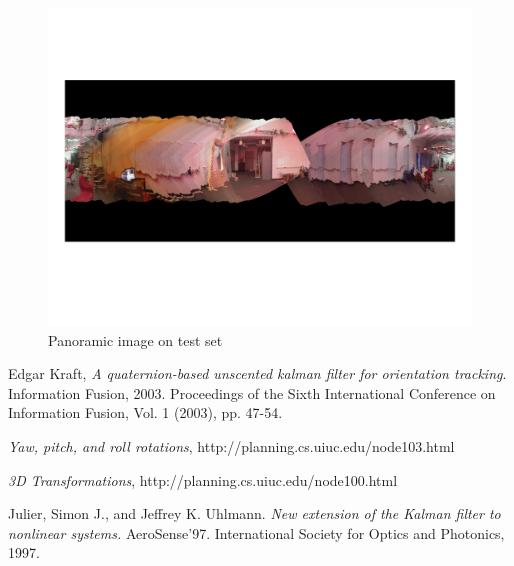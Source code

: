 \documentclass[english]{article}
\begin{document}
\begin{figure}
\centering
\includegraphics[scale=0.5]{images/pano_test.png} 
\caption{Panoramic image on test set}
\label{fig:pano_test}
\end{figure}


\begin{thebibliography}{2} %

Edgar Kraft, \emph{A quaternion-based unscented kalman filter for orientation tracking}. Information Fusion, 2003. Proceedings of the Sixth International Conference on Information Fusion, Vol. 1 (2003), pp. 47-54. 

\emph{Yaw, pitch, and roll rotations}, http://planning.cs.uiuc.edu/node103.html

\emph{3D Transformations}, http://planning.cs.uiuc.edu/node100.html

Julier, Simon J., and Jeffrey K. Uhlmann. \emph{New extension of the Kalman filter to nonlinear systems.} AeroSense'97. International Society for Optics and Photonics, 1997.

\end{thebibliography}
\end{document}
